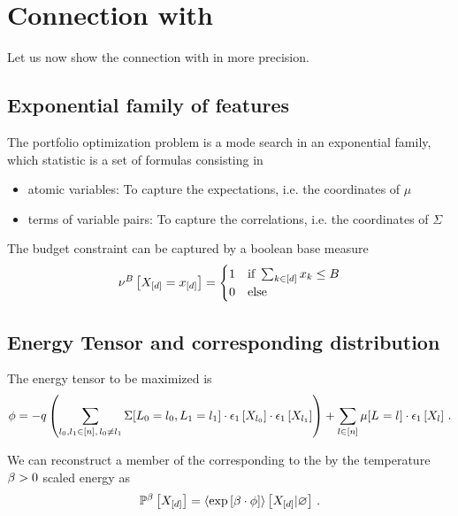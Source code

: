 \documentclass[aps,onecolumn,nofootinbib,pra]{article}
\begin{document}
    \section{Connection with \tnreason{}}

    Let us now show the connection with \tnreason{} in more precision.

    \subsection{Exponential family of features}

    The portfolio optimization problem is a mode search in an exponential family, which statistic is a set of formulas consisting in
    \begin{itemize}
        \item atomic variables: To capture the expectations, i.e. the coordinates of $\mu$
        \item terms of variable pairs: To capture the correlations, i.e. the coordinates of $\Sigma$
    \end{itemize}

    The budget constraint can be captured by a boolean base measure
    \begin{align*}
        \nu^{B}\left[X_{[d]}=x_{[d]}\right]
        =\begin{cases}
             1 & \text{if } \sum_{k\in[d]}x_{k} \leq B \\
             0 & \text{else}
        \end{cases}
    \end{align*}

    \subsection{Energy Tensor and corresponding distribution}

    The energy tensor to be maximized is
    \[ \phi = - q \left(\sum_{l_{0},l_{1}\in[n] , \, l_{0}\neq l_{1}}
    \Sigma[L_{0}=l_{0},L_{1}=l_{1}] \cdot \epsilon_{1}\left[X_{l_{0}}\right]\cdot \epsilon_{1}\left[X_{l_{1}}\right]\right)
    + \sum_{l\in[n]} \mu[L_{}=l_{}] \cdot \epsilon_{1}\left[X_{l}\right] \, . \]

    We can reconstruct a member of the corresponding \MarkovLogicNetwork{} to the by the temperature $\beta>0$ scaled energy as
    \begin{align*}
        \mathbb{P}^{\beta}\left[X_{[d]}\right] = \left\langle \mathrm{exp}\left[\beta\cdot\phi\right]\right\rangle \left[ X_{[d]} | \varnothing \right] \, .
    \end{align*}
\end{document}
